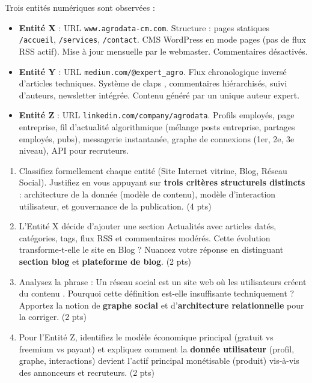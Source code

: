 \documentclass[11pt]{article}
\begin{document}
\begin{exercice}
Trois entités numériques sont observées : 
\begin{itemize}
    \item \textbf{Entité X} : URL \texttt{www.agrodata-cm.com}. Structure : pages statiques \texttt{/accueil}, \texttt{/services}, \texttt{/contact}. CMS WordPress en mode \og{} pages \fg{} (pas de flux RSS actif). Mise à jour mensuelle par le webmaster. Commentaires désactivés.
    \item \textbf{Entité Y} : URL \texttt{medium.com/@expert\_agro}. Flux chronologique inversé d'articles techniques. Système de \og{} claps \fg{}, commentaires hiérarchisés, suivi d'auteurs, newsletter intégrée. Contenu généré par un unique auteur expert.
    \item \textbf{Entité Z} : URL \texttt{linkedin.com/company/agrodata}. Profils employés, page entreprise, fil d'actualité algorithmique (mélange posts entreprise, partages employés, pubs), messagerie instantanée, graphe de connexions (1er, 2e, 3e niveau), API pour recruteurs.
\end{itemize}
\begin{enumerate}
    \item Classifiez formellement chaque entité (Site Internet vitrine, Blog, Réseau Social). Justifiez en vous appuyant sur \textbf{trois critères structurels distincts} : architecture de la donnée (modèle de contenu), modèle d'interaction utilisateur, et gouvernance de la publication. (4 pts)
    \item L'Entité X décide d'ajouter une section \og{} Actualités \fg{} avec articles datés, catégories, tags, flux RSS et commentaires modérés. Cette évolution transforme-t-elle le site en \og{} Blog \fg{} ? Nuancez votre réponse en distinguant \textbf{section blog} et \textbf{plateforme de blog}. (2 pts)
    \item Analysez la phrase : \og{} Un réseau social est un site web où les utilisateurs créent du contenu \fg{}. Pourquoi cette définition est-elle insuffisante techniquement ? Apportez la notion de \textbf{graphe social} et d'\textbf{architecture relationnelle} pour la corriger. (2 pts)
    \item Pour l'Entité Z, identifiez le modèle économique principal (gratuit vs freemium vs payant) et expliquez comment la \textbf{donnée utilisateur} (profil, graphe, interactions) devient l'actif principal monétisable (produit) vis-à-vis des annonceurs et recruteurs. (2 pts)
\end{enumerate}
\end{exercice}
\end{document}
